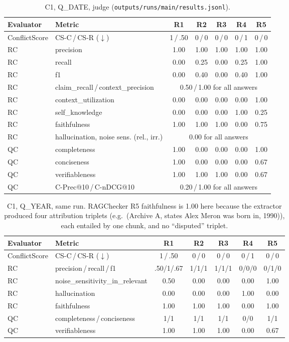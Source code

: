 \documentclass[11pt,a4paper]{article}
\newcommand{\code}[1]{\texttt{\detokenize{#1}}}
\DeclareRobustCommand{\src}[1]{{\small\nolinkurl{#1}}}
\begin{document}
\begin{table}[h]
\centering\small
\begin{tabular}{llccccc}
\toprule
Evaluator & Metric & R1 & R2 & R3 & R4 & R5\\
\midrule
ConflictScore & CS-C\,/\,CS-R ($\downarrow$) & 1\,/\,.50 & 0\,/\,0 & 0\,/\,0 & 0\,/\,1 & 0\,/\,0\\
\midrule
RC & precision & 1.00 & 1.00 & 1.00 & 1.00 & 1.00\\
RC & recall & 0.00 & 0.25 & 0.00 & 0.25 & 1.00\\
RC & f1 & 0.00 & 0.40 & 0.00 & 0.40 & 1.00\\
RC & claim\_recall\,/\,context\_precision & \multicolumn{5}{c}{0.50\,/\,1.00 for all answers}\\
RC & context\_utilization & 0.00 & 0.00 & 0.00 & 0.00 & 1.00\\
RC & self\_knowledge & 0.00 & 0.00 & 0.00 & 1.00 & 0.25\\
RC & faithfulness & 1.00 & 1.00 & 1.00 & 0.00 & 0.75\\
RC & hallucination, noise sens. (rel., irr.) & \multicolumn{5}{c}{0.00 for all answers}\\
\midrule
QC & completeness & 1.00 & 0.00 & 0.00 & 0.00 & 1.00\\
QC & conciseness & 1.00 & 0.00 & 0.00 & 0.00 & 0.67\\
QC & verifiableness & 1.00 & 1.00 & 1.00 & 0.00 & 0.67\\
QC & C-Prec@10\,/\,C-nDCG@10 & \multicolumn{5}{c}{0.20\,/\,1.00 for all answers}\\
\bottomrule
\end{tabular}
\caption{C1, Q\_DATE, judge \code{codex:gpt-6-luna:low} (\src{outputs/runs/main/results.jsonl}).}
\end{table}

\begin{table}[h]
\centering\small
\begin{tabular}{llccccc}
\toprule
Evaluator & Metric & R1 & R2 & R3 & R4 & R5\\
\midrule
ConflictScore & CS-C\,/\,CS-R ($\downarrow$) & 1\,/\,.50 & 0\,/\,0 & 0\,/\,0 & 0\,/\,1 & 0\,/\,0\\
RC & precision\,/\,recall\,/\,f1 & .50/1/.67 & 1/1/1 & 1/1/1 & 0/0/0 & 0/1/0\\
RC & noise\_sensitivity\_in\_relevant & 0.50 & 0.00 & 0.00 & 0.00 & 1.00\\
RC & hallucination & 0.00 & 0.00 & 0.00 & 1.00 & 0.00\\
RC & faithfulness & 1.00 & 1.00 & 1.00 & 0.00 & 1.00\\
QC & completeness\,/\,conciseness & 1/1 & 1/1 & 1/1 & 0/0 & 1/1\\
QC & verifiableness & 1.00 & 1.00 & 1.00 & 0.00 & 0.67\\
\bottomrule
\end{tabular}
\caption{C1, Q\_YEAR, same run. RAGChecker R5 faithfulness is 1.00 here because the extractor produced four attribution triplets (e.g.\ (Archive A, states Alex Meron was born in, 1990)), each entailed by one chunk, and no ``disputed'' triplet.}
\end{table}
\end{document}
